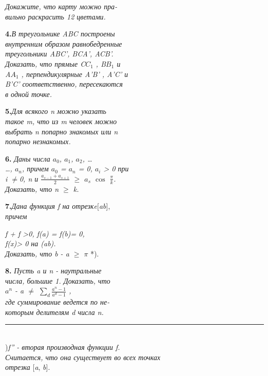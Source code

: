 \begin{minipage}[b]{0.47\textwidth}
    \normalsize\textit{Докажите, что карту можно пра-\\
    вильно раскрасить 12 цветами.}

    \qquad \textbf{4.}\textit{В треугольнике ABC построены\\
    внутренним образом равнобедренные\\
    треугольники ABC', BCA', ACB'.\\
    Доказать, что прямые C$C_1$ , B$B_1$ и\\
    A$A_1$ , перпендикулярные A'B' , A'C' и\\
    B'C' соответственно, пересекаются\\
    в одной точке.}

    \qquad \textbf{5.}\textit{Для всякого n можно указать\\
     такое m, что из m человек можно\\
     выбрать n попарно знакомых или n\\
     попарно незнакомых.}

    \qquad \textbf{6.} \textit{Даны числа $a_0$, $a_1$, $a_2$, \ldots\\
     \ldots, $a_n$, причем $a_0$ = $a_n$ = 0, $a_i$ > 0 при\\
     i $\not=$0, n и $\frac{a_{s-1} + a_{s+1}}{2}$ $\ge$ $a_s$ $\cos$ $\frac{\pi}{k}$.\\
     Доказать, что n $\ge$ k.}

     \qquad \textbf{7.}\textit{Дана функция f на отрезкe}[\textit{ab}],\\
     \textit{причем}

     \qquad\textit{ f + f >0,     f(a) = f(b)= 0,\\
     \indent \indent \indent f(x)> 0 на (ab).\\
     Доказать, что b - a $\ge$ $\pi$} *).

    \qquad \textbf{8.} \textit{Пусть a и n - наутральные\\
     числа, большие 1. Доказать, что\\
    \indent \indent \indent $a^n$ - a $\not =$ $\displaystyle\sum_d\frac{a^n - 1}{a^d - 1}$ ,\\
     где суммирование ведется по не-\\
     которым делителям d числа n.}\\
     \noindent\rule{2cm}{0.4pt}\\
     \scriptsize*)\textit{f'' - вторая производная функции f.\\
     Считается, что она существует во всех точках\\
     отрезка} [\textit{a}, \textit{b}].\\
\end{minipage}
